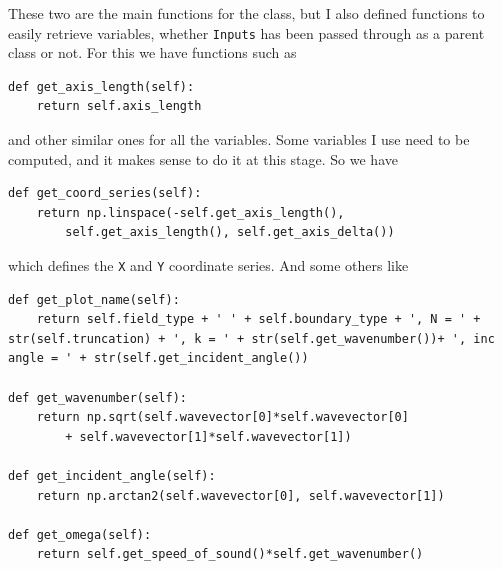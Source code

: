 These two are the main functions for the class, but I also defined functions to easily retrieve variables, whether \verb!Inputs! has been passed through as a parent class or not. For this we have functions such as
\begin{lstlisting}
def get_axis_length(self):
    return self.axis_length\end{lstlisting}
and other similar ones for all the variables. Some variables I use need to be computed, and it makes sense to do it at this stage. So we have
\begin{lstlisting}
def get_coord_series(self):
    return np.linspace(-self.get_axis_length(),
        self.get_axis_length(), self.get_axis_delta())
\end{lstlisting}
which defines the \verb!X! and \verb!Y! coordinate series. And some others like
\begin{lstlisting}
def get_plot_name(self):
    return self.field_type + ' ' + self.boundary_type + ', N = ' + str(self.truncation) + ', k = ' + str(self.get_wavenumber())+ ', inc angle = ' + str(self.get_incident_angle())

def get_wavenumber(self):
    return np.sqrt(self.wavevector[0]*self.wavevector[0]
        + self.wavevector[1]*self.wavevector[1])

def get_incident_angle(self):
    return np.arctan2(self.wavevector[0], self.wavevector[1])

def get_omega(self):
    return self.get_speed_of_sound()*self.get_wavenumber()
\end{lstlisting}

